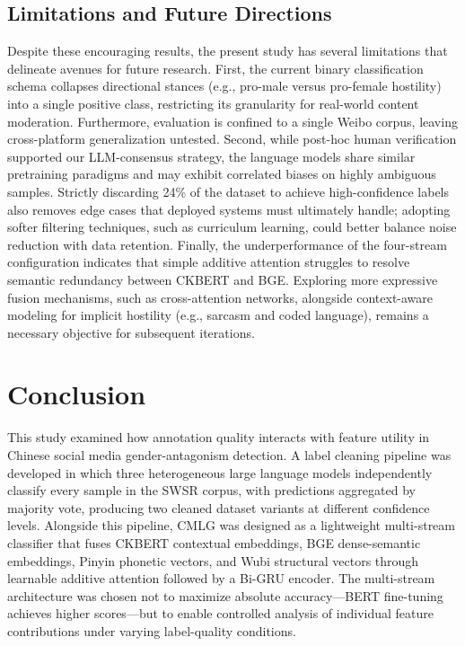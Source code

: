 ﻿\documentclass[12pt]{article}
\begin{document}
\subsection{Limitations and Future Directions}
Despite these encouraging results, the present study has several limitations that delineate avenues for future research. First, the current binary classification schema collapses directional stances (e.g., pro-male versus pro-female hostility) into a single positive class, restricting its granularity for real-world content moderation. Furthermore, evaluation is confined to a single Weibo corpus, leaving cross-platform generalization untested. Second, while post-hoc human verification supported our LLM-consensus strategy, the language models share similar pretraining paradigms and may exhibit correlated biases on highly ambiguous samples. Strictly discarding 24\% of the dataset to achieve high-confidence labels also removes edge cases that deployed systems must ultimately handle; adopting softer filtering techniques, such as curriculum learning, could better balance noise reduction with data retention. Finally, the underperformance of the four-stream configuration indicates that simple additive attention struggles to resolve semantic redundancy between CKBERT and BGE. Exploring more expressive fusion mechanisms, such as cross-attention networks, alongside context-aware modeling for implicit hostility (e.g., sarcasm and coded language), remains a necessary objective for subsequent iterations.

\section{Conclusion}
This study examined how annotation quality interacts with feature utility in Chinese social media gender-antagonism detection. A label cleaning pipeline was developed in which three heterogeneous large language models independently classify every sample in the SWSR corpus, with predictions aggregated by majority vote, producing two cleaned dataset variants at different confidence levels. Alongside this pipeline, CMLG was designed as a lightweight multi-stream classifier that fuses CKBERT contextual embeddings, BGE dense-semantic embeddings, Pinyin phonetic vectors, and Wubi structural vectors through learnable additive attention followed by a Bi-GRU encoder. The multi-stream architecture was chosen not to maximize absolute accuracy---BERT fine-tuning achieves higher scores---but to enable controlled analysis of individual feature contributions under varying label-quality conditions.
\end{document}
